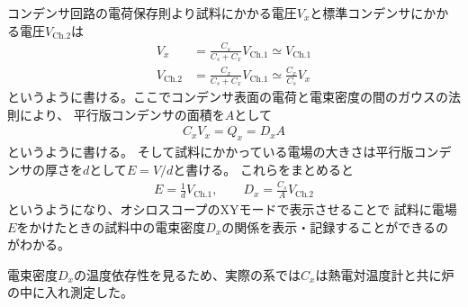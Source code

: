 \documentclass[9pt,dvipdfmx,a4paper]{jsarticle}
\begin{document}
コンデンサ回路の電荷保存則より試料にかかる電圧\(V_x\)と標準コンデンサにかかる電圧\(V_{\text{Ch.2}}\)は
\begin{align}
    V_x &= \frac{C_s}{C_s+C_x}V_{\text{Ch.1}} \simeq V_{\text{Ch.1}}\\
    V_{\text{Ch.2}} &= \frac{C_x}{C_s+C_x}V_{\text{Ch.1}} \simeq \frac{C_x}{C_s}V_x
\end{align}
というように書ける。ここでコンデンサ表面の電荷と電束密度の間のガウスの法則により、
平行版コンデンサの面積を\(A\)として
\begin{align}
    C_x V_x = Q_x = D_x A
\end{align}
というように書ける。
そして試料にかかっている電場の大きさは平行版コンデンサの厚さを\(d\)として\(E = V/d\)と書ける。
これらをまとめると
\begin{align}
    E = \frac{1}{d}V_{\text{Ch.1}}, \qquad
    D_x = \frac{C_s}{A}V_{\text{Ch.2}}
\end{align}
というようになり、オシロスコープのXYモードで表示させることで
試料に電場\(E\)をかけたときの試料中の電束密度\(D_x\)の関係を表示・記録することができるのがわかる。

電束密度\(D_x\)の温度依存性を見るため、実際の系では\(C_x\)は熱電対温度計と共に炉の中に入れ測定した。
\end{document}
